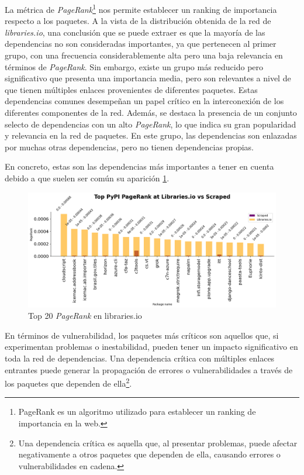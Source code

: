 La métrica de \textit{PageRank}\footnote{PageRank es un algoritmo utilizado para establecer un ranking de importancia en la web.}
nos permite establecer un ranking de importancia respecto a los paquetes. A la vista de la distribución obtenida de la red
de \textit{libraries.io}, una conclusión que se puede extraer es que la mayoría de las dependencias no son consideradas
importantes, ya que pertenecen al primer grupo, con una frecuencia considerablemente alta pero una baja relevancia en
términos de \textit{PageRank}. Sin embargo, existe un grupo más reducido pero significativo que presenta una importancia
media, pero son relevantes a nivel de que tienen múltiples enlaces provenientes de diferentes paquetes. Estas dependencias
comunes desempeñan un papel crítico en la interconexión de los diferentes componentes de la red. Además, se destaca
la presencia de un conjunto selecto de dependencias con un alto \textit{PageRank}, lo que indica su gran popularidad
y relevancia en la red de paquetes. En este grupo, las dependencias son enlazadas por muchas otras dependencias,
pero no tienen dependencias propias.

En concreto, estas son las dependencias más importantes a tener en cuenta debido a que suelen ser común su
aparición \ref{fig:Top 20 pagerank en libraries.io}.

\begin{figure}[h!]
    \begin{center}
        \includegraphics[width=1\textwidth]{img/pypi/libio_t20_pr_comparison.png}
        \caption{Top 20 \textit{PageRank} en libraries.io}
        \label{fig:Top 20 pagerank en libraries.io}
    \end{center}
\end{figure}


En términos de vulnerabilidad, los paquetes más críticos son aquellos que, si experimentan problemas o inestabilidad,
pueden tener un impacto significativo en toda la red de dependencias. Una dependencia crítica con múltiples enlaces
entrantes puede generar la propagación de errores o vulnerabilidades a través de los paquetes que dependen de
ella\footnote{Una dependencia crítica es aquella que, al presentar problemas, puede afectar negativamente a
    otros paquetes que dependen de ella, causando errores o vulnerabilidades en cadena.}.


